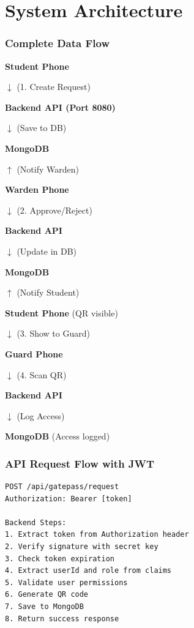 \documentclass[11pt]{beamer}
\begin{document}
\section{System Architecture}

\begin{frame}
\frametitle{Complete Data Flow}
\begin{center}
\small

\textbf{Student Phone}

$\downarrow$ (1. Create Request)

\textbf{Backend API (Port 8080)}

$\downarrow$ (Save to DB)

\textbf{MongoDB}

$\uparrow$ (Notify Warden)

\textbf{Warden Phone}

$\downarrow$ (2. Approve/Reject)

\textbf{Backend API}

$\downarrow$ (Update in DB)

\textbf{MongoDB}

$\uparrow$ (Notify Student)

\textbf{Student Phone} (QR visible)

$\downarrow$ (3. Show to Guard)

\textbf{Guard Phone}

$\downarrow$ (4. Scan QR)

\textbf{Backend API}

$\downarrow$ (Log Access)

\textbf{MongoDB} (Access logged)

\end{center}
\end{frame}

\begin{frame}
\frametitle{API Request Flow with JWT}
\begin{lstlisting}
POST /api/gatepass/request
Authorization: Bearer [token]

Backend Steps:
1. Extract token from Authorization header
2. Verify signature with secret key
3. Check token expiration
4. Extract userId and role from claims
5. Validate user permissions
6. Generate QR code
7. Save to MongoDB
8. Return success response
\end{lstlisting}
\end{frame}
\end{document}
